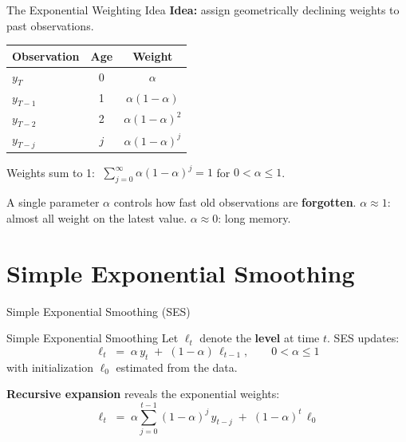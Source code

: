 \documentclass[aspectratio=169, 11pt]{beamer}
\begin{document}
\begin{frame}{The Exponential Weighting Idea}
  \textbf{Idea:} assign geometrically declining weights to past observations.
  \begin{center}
    \begin{tabular}{lcc}
      \toprule
      Observation & Age & Weight \\
      \midrule
      $y_T$     & 0 & $\alpha$ \\
      $y_{T-1}$ & 1 & $\alpha(1-\alpha)$ \\
      $y_{T-2}$ & 2 & $\alpha(1-\alpha)^2$ \\
      $y_{T-j}$ & $j$ & $\alpha(1-\alpha)^j$ \\
      \bottomrule
    \end{tabular}
  \end{center}
  Weights sum to 1: $\;\sum_{j=0}^{\infty}\alpha(1-\alpha)^j = 1$ for $0 < \alpha \leq 1$.
  \begin{keybox}
    A single parameter $\alpha$ controls how fast old observations are
    \textbf{forgotten}.
    \quad \textbf{$\alpha \approx 1$}: almost all weight on the latest value.
    \quad \textbf{$\alpha \approx 0$}: long memory.
  \end{keybox}
\end{frame}

\section{Simple Exponential Smoothing}


\begin{frame}{Simple Exponential Smoothing (SES)}
  \begin{definitionbox}{Simple Exponential Smoothing}
    {\small Let $\ell_t$ denote the \textbf{level} at time $t$. SES updates:
    \[
      \ell_t \;=\; \alpha\, y_t \;+\; (1-\alpha)\,\ell_{t-1},
      \qquad 0 < \alpha \leq 1
    \]
    with initialization $\ell_0$ estimated from the data.}
  \end{definitionbox}
  \vspace{0.1cm}
  \textbf{Recursive expansion} reveals the exponential weights:
  \[
    \ell_t \;=\; \alpha\sum_{j=0}^{t-1}(1-\alpha)^j\,y_{t-j}
              \;+\; (1-\alpha)^t\,\ell_0
  \]
\end{frame}
\end{document}
